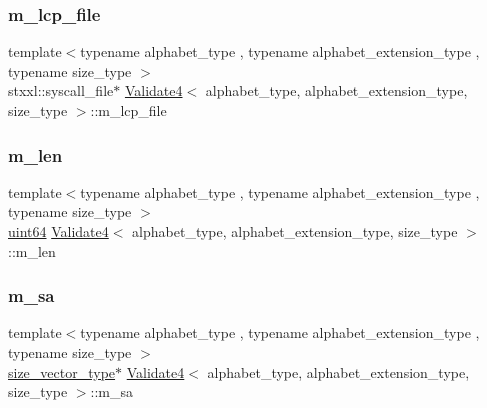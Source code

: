 \mbox{\label{class_validate4_a04f44eed3b6ea4534076aff282adf037}} 
\subsubsection{\texorpdfstring{m\+\_\+lcp\+\_\+file}{m\_lcp\_file}}
{\footnotesize\ttfamily template$<$typename alphabet\+\_\+type , typename alphabet\+\_\+extension\+\_\+type , typename size\+\_\+type $>$ \\
stxxl\+::syscall\+\_\+file$\ast$ \hyperlink{class_validate4}{Validate4}$<$ alphabet\+\_\+type, alphabet\+\_\+extension\+\_\+type, size\+\_\+type $>$\+::m\+\_\+lcp\+\_\+file\hspace{0.3cm}{\ttfamily [private]}}

\mbox{\label{class_validate4_a4b57f273604a17a02e891b43bdd7f03e}} 
\subsubsection{\texorpdfstring{m\+\_\+len}{m\_len}}
{\footnotesize\ttfamily template$<$typename alphabet\+\_\+type , typename alphabet\+\_\+extension\+\_\+type , typename size\+\_\+type $>$ \\
\hyperlink{types_8h_a60e8696a4678cd348e991a1f172e53f7}{uint64} \hyperlink{class_validate4}{Validate4}$<$ alphabet\+\_\+type, alphabet\+\_\+extension\+\_\+type, size\+\_\+type $>$\+::m\+\_\+len\hspace{0.3cm}{\ttfamily [private]}}

\mbox{\label{class_validate4_aa6e516f93f9b184ebf958a4c314588d5}} 
\subsubsection{\texorpdfstring{m\+\_\+sa}{m\_sa}}
{\footnotesize\ttfamily template$<$typename alphabet\+\_\+type , typename alphabet\+\_\+extension\+\_\+type , typename size\+\_\+type $>$ \\
\hyperlink{class_validate4_a46ea31a0a4b23f583806792160421d15}{size\+\_\+vector\+\_\+type}$\ast$ \hyperlink{class_validate4}{Validate4}$<$ alphabet\+\_\+type, alphabet\+\_\+extension\+\_\+type, size\+\_\+type $>$\+::m\+\_\+sa\hspace{0.3cm}{\ttfamily [private]}}

